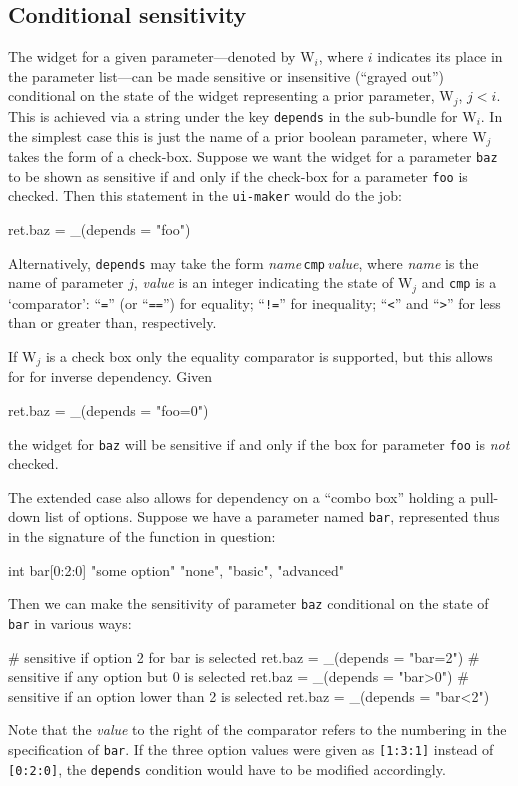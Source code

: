 \documentclass[oneside]{book}
\begin{document}
\subsection{Conditional sensitivity}

The widget for a given parameter---denoted by \textsf{W}$_i$, where
$i$ indicates its place in the parameter list---can be made sensitive
or insensitive (``grayed out'') conditional on the state of the widget
representing a prior parameter, \textsf{W}$_j$, $j<i$. This is
achieved via a string under the key \texttt{depends} in the sub-bundle
for \textsf{W}$_i$.  In the simplest case this is just the name of a
prior boolean parameter, where \textsf{W}$_j$ takes the form of a
check-box. Suppose we want the widget for a parameter \texttt{baz} to
be shown as sensitive if and only if the check-box for a parameter
\texttt{foo} is checked. Then this statement in the \texttt{ui-maker}
would do the job:
\begin{code}
ret.baz = _(depends = "foo")
\end{code}

Alternatively, \texttt{depends} may take the form
\textsl{name}\,\texttt{cmp}\,\textsl{value}, where \textsl{name} is
the name of parameter $j$, \textsl{value} is an integer indicating the
state of \textsf{W}$_j$ and \texttt{cmp} is a `comparator':
``\texttt{=}'' (or ``\texttt{==}'') for equality; ``\texttt{!=}'' for
inequality; ``\texttt{<}'' and ``\texttt{>}'' for less than or greater
than, respectively.

If \textsf{W}$_j$ is a check box only the equality comparator is
supported, but this allows for for inverse dependency. Given
\begin{code}
ret.baz = _(depends = "foo=0")
\end{code}
the widget for \texttt{baz} will be sensitive if and only if the box
for parameter \texttt{foo} is \textit{not} checked.

The extended case also allows for dependency on a ``combo box''
holding a pull-down list of options. Suppose we have a parameter named
\texttt{bar}, represented thus in the signature of the function in
question:
\begin{code}
int bar[0:2:0] "some option" {"none", "basic", "advanced"}
\end{code}
Then we can make the sensitivity of parameter \texttt{baz} conditional
on the state of \texttt{bar} in various ways:
\begin{code}
# sensitive if option 2 for bar is selected
ret.baz = _(depends = "bar=2")
# sensitive if any option but 0 is selected
ret.baz = _(depends = "bar>0")
# sensitive if an option lower than 2 is selected
ret.baz = _(depends = "bar<2")
\end{code}
Note that the \textsl{value} to the right of the comparator refers to
the numbering in the specification of \texttt{bar}. If the three
option values were given as \texttt{[1:3:1]} instead of
\texttt{[0:2:0]}, the \texttt{depends} condition would have to be
modified accordingly.
\end{document}
